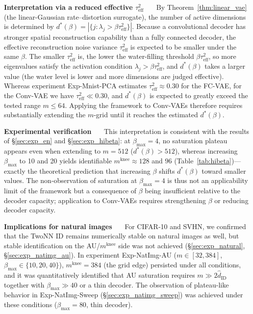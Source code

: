 \documentclass[make,article,submit,pdftex,moreauthors]{Definitions/mdpi}
\newcommand{\mknee}{m^{\mathrm{knee}}}
\begin{document}
\textbf{Interpretation via a reduced effective $\tau^2_\mathrm{eff}$}~~~
By Theorem~\ref{thm:linear_vae} (the linear-Gaussian rate--distortion surrogate),
the number of active dimensions is determined by
$d^*(\beta) = |\{j : \lambda_j > \beta\tau^2_\mathrm{eff}\}|$.
Because a convolutional decoder has stronger spatial reconstruction capability than a
fully connected decoder, the effective reconstruction noise variance
$\tau^2_\mathrm{eff}$ is expected to be smaller under the same $\beta$.
The smaller $\tau^2_\mathrm{eff}$ is, the lower the water-filling threshold
$\beta\tau^2_\mathrm{eff}$, so more eigenvalues satisfy the activation condition
$\lambda_j > \beta\tau^2_\mathrm{eff}$, and $d^*(\beta)$ takes a larger value
(the water level is lower and more dimensions are judged effective).
Whereas experiment Exp-Mnist-PCA estimates $\tau^2_\mathrm{eff} \approx 0.30$ for the
FC-VAE, for the Conv-VAE we have $\tau^2_\mathrm{eff} \ll 0.30$, and $d^*(\beta)$ is
expected to greatly exceed the tested range $m \leq 64$.
Applying the framework to Conv-VAEs therefore requires substantially extending the
$m$-grid until it reaches the estimated $d^*(\beta)$.

\textbf{Experimental verification}~~~
This interpretation is consistent with the results of \S\ref{sec:exp_en} and
\S\ref{sec:exp_hibeta}: at $\beta_{\max}=4$, no saturation plateau appears even when
extending to $m=512$ ($d^*(\beta) > 512$), whereas increasing $\beta_{\max}$ to 10 and
20 yields identifiable $\mknee \approx 128$ and $96$ (Table~\ref{tab:hibeta})---exactly
the theoretical prediction that increasing $\beta$ shifts $d^*(\beta)$ toward smaller
values.
The non-observation of saturation at $\beta_{\max}=4$ is thus not an applicability
limit of the framework but a consequence of $\beta$ being insufficient relative to the
decoder capacity; application to Conv-VAEs requires strengthening $\beta$ or reducing
decoder capacity.


\textbf{Implications for natural images}~~~
For CIFAR-10 and SVHN, we confirmed that the TwoNN ID remains numerically stable on
natural images as well, but stable identification on the AU/$\mknee$ side was not
achieved (\S\ref{sec:exp_natural}, \S\ref{sec:exp_natimg_au}).
In experiment Exp-NatImg-AU ($m \in [32, 384]$, $\beta_{\max} \in \{10,20,40\}$),
$\mknee = 384$ (the grid edge) persisted under all conditions, and it was quantitatively
identified that AU saturation requires $m \gg 2\hat{d}_\mathrm{ID}$ together with
$\beta_{\max} \gg 40$ or a thin decoder.
The observation of plateau-like behavior in Exp-NatImg-Sweep
(\S\ref{sec:exp_natimg_sweep}) was achieved under these conditions
($\beta_{\max}=80$, thin decoder).
\end{document}

